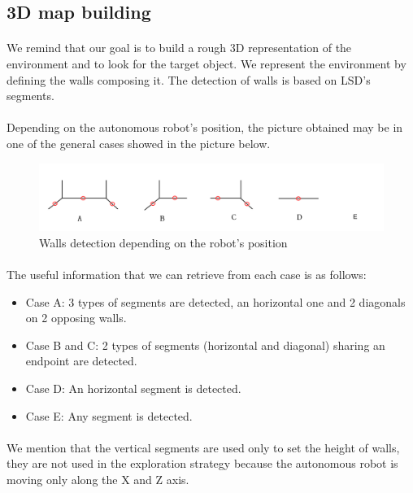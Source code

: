 \documentclass[12pt]{report}
\begin{document}
    \subsection{3D map building}
    
    \paragraph{}
    We remind that our goal is to build a rough 3D representation of the environment and to look for the target object. We represent the environment by defining the walls composing it. The detection of walls is based on LSD's segments.
    
    \paragraph{}
    Depending on the autonomous robot's position, the picture obtained may be in one of the general cases showed in the picture below. 
    
    
    	\begin{figure}[H]
    	\begin{center}
    		\includegraphics[scale=0.65]{res/cases_seg.png}
    		\caption{Walls detection depending on the robot's position}
    	\end{center}
    \end{figure}
 \paragraph{}
 The useful information that we can retrieve from each case is as follows:
 \begin{itemize}
 	\item Case A: 3 types of segments are detected, an horizontal one and 2 diagonals on 2 opposing walls.
 	\item Case B and C: 2 types of segments (horizontal and diagonal) sharing an endpoint are detected.
 	\item Case D: An horizontal segment is detected.
 	\item Case E: Any segment is detected.
 	
 \end{itemize}
 \paragraph{}
 We mention that the vertical segments are used only to set the height of walls, they are not used in the exploration strategy because the autonomous robot is moving only along the X and Z axis.
\end{document}
